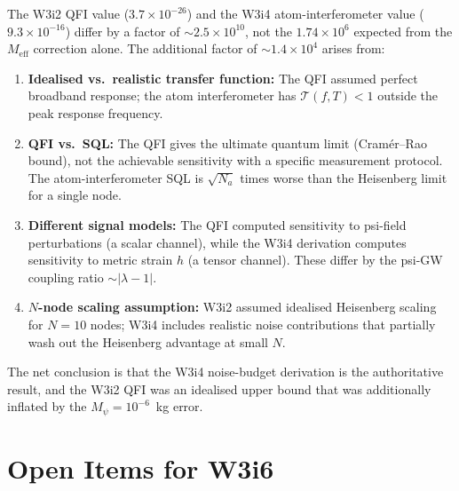 \documentclass[11pt]{article}
\theoremstyle{definition}
\theoremstyle{remark}
\newcommand{\ee}[1]{\times10^{#1}}
\newcommand{\lambdaone}{|\lambda-1|}
\newcommand{\Meff}{M_{\mathrm{eff}}}
\newcommand{\Mpsi}{M_\psi}
\begin{document}
The W3i2 QFI value ($3.7\ee{-26}$) and the W3i4 atom-interferometer value
($9.3\ee{-16}$) differ by a factor of $\sim 2.5\ee{10}$, not the
$1.74\ee{6}$ expected from the $\Meff$ correction alone. The additional
factor of $\sim 1.4\ee{4}$ arises from:

\begin{enumerate}
\item \textbf{Idealised vs.\ realistic transfer function:} The QFI assumed
  perfect broadband response; the atom interferometer has
  $\mathcal{T}(f,T) < 1$ outside the peak response frequency.

\item \textbf{QFI vs.\ SQL:} The QFI gives the ultimate quantum limit
  (Cram\'{e}r--Rao bound), not the achievable sensitivity with a
  specific measurement protocol. The atom-interferometer SQL is
  $\sqrt{N_a}$ times worse than the Heisenberg limit for a single node.

\item \textbf{Different signal models:} The QFI computed sensitivity
  to psi-field perturbations (a scalar channel), while the W3i4
  derivation computes sensitivity to metric strain $h$ (a tensor channel).
  These differ by the psi-GW coupling ratio $\sim \lambdaone$.

\item \textbf{$N$-node scaling assumption:} W3i2 assumed idealised
  Heisenberg scaling for $N=10$ nodes; W3i4 includes realistic noise
  contributions that partially wash out the Heisenberg advantage at
  small $N$.
\end{enumerate}

The net conclusion is that the W3i4 noise-budget derivation is the
authoritative result, and the W3i2 QFI was an idealised upper bound
that was additionally inflated by the $\Mpsi = 10^{-6}$~kg error.

\section{Open Items for W3i6}
\label{sec:open}
\end{document}
